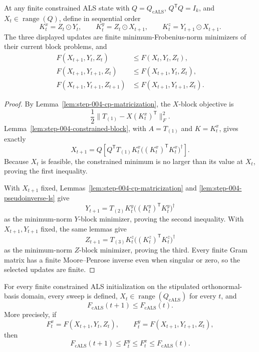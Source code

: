 \begin{proposition}\label{prop:step-004-block-updates}
At any finite constrained ALS state with
$Q=Q_{\mathrm{cALS}}$, $Q^{\mathsf T}Q=I_k$, and
$X_t\in\operatorname{range}(Q)$, define in sequential order
\[
 K_t^x=Z_t\odot Y_t,
 \qquad K_t^y=Z_t\odot X_{t+1},
 \qquad K_t^z=Y_{t+1}\odot X_{t+1}.
\]
The three displayed updates are finite minimum-Frobenius-norm minimizers of
their current block problems, and
\[
 \begin{aligned}
 F(X_{t+1},Y_t,Z_t)&\le F(X_t,Y_t,Z_t),\\
 F(X_{t+1},Y_{t+1},Z_t)&\le F(X_{t+1},Y_t,Z_t),\\
 F(X_{t+1},Y_{t+1},Z_{t+1})&\le F(X_{t+1},Y_{t+1},Z_t).
 \end{aligned}
\]
\end{proposition}

\begin{proof}
By Lemma~\ref{lem:step-004-cp-matricization}, the $X$-block objective is
\[
 \frac12\|T_{(1)}-X(K_t^x)^{\mathsf T}\|_F^2.
\]
Lemma~\ref{lem:step-004-constrained-block}, with $A=T_{(1)}$ and
$K=K_t^x$, gives exactly
\[
 X_{t+1}=Q\left[Q^{\mathsf T}T_{(1)}K_t^x
 \bigl((K_t^x)^{\mathsf T}K_t^x\bigr)^\dagger\right].
\]
Because $X_t$ is feasible, the constrained minimum is no larger than its
value at $X_t$, proving the first inequality.

With $X_{t+1}$ fixed, Lemmas~\ref{lem:step-004-cp-matricization} and
\ref{lem:step-004-pseudoinverse-ls} give
\[
 Y_{t+1}=T_{(2)}K_t^y
 \bigl((K_t^y)^{\mathsf T}K_t^y\bigr)^\dagger
\]
as the minimum-norm $Y$-block minimizer, proving the second inequality.  With
$X_{t+1},Y_{t+1}$ fixed, the same lemmas give
\[
 Z_{t+1}=T_{(3)}K_t^z
 \bigl((K_t^z)^{\mathsf T}K_t^z\bigr)^\dagger
\]
as the minimum-norm $Z$-block minimizer, proving the third.  Every finite
Gram matrix has a finite Moore--Penrose inverse even when singular or zero,
so the selected updates are finite.
\end{proof}

\begin{proposition}\label{prop:step-004-sequential-descent}
For every finite constrained ALS initialization on the stipulated
orthonormal-basis domain, every sweep is defined,
$X_t\in\operatorname{range}(Q_{\mathrm{cALS}})$ for every $t$, and
\[
 F_{\mathrm{cALS}}(t+1)\le F_{\mathrm{cALS}}(t).
\]
More precisely, if
\[
 F_t^x=F(X_{t+1},Y_t,Z_t),
 \qquad
 F_t^y=F(X_{t+1},Y_{t+1},Z_t),
\]
then
\[
 F_{\mathrm{cALS}}(t+1)\le F_t^y\le F_t^x
 \le F_{\mathrm{cALS}}(t).
\]
\end{proposition}

